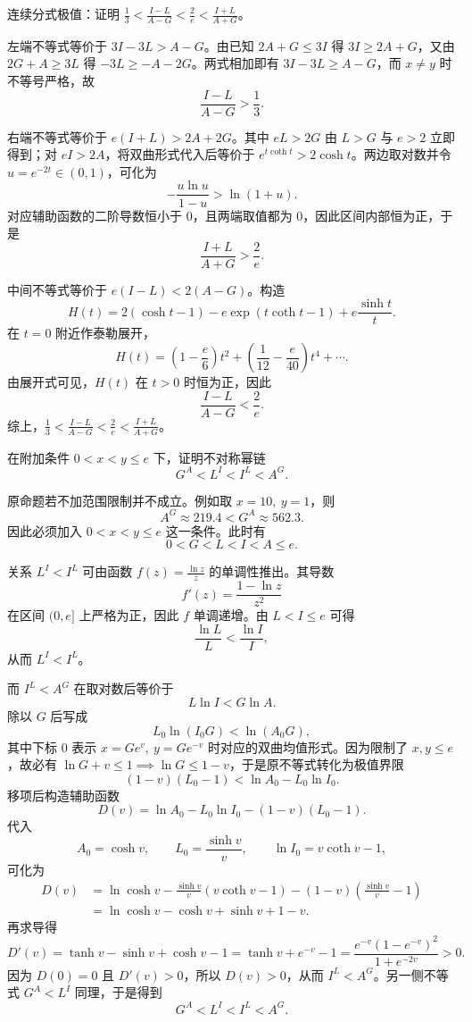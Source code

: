 \begin{example}
连续分式极值：证明 $\frac{1}{3} < \frac{I-L}{A-G} < \frac{2}{e} < \frac{I+L}{A+G}$。
\end{example}
\begin{solution}
左端不等式等价于 $3I - 3L > A-G$。由已知 $2A+G \le 3I$ 得 $3I \ge 2A+G$，又由 $2G+A \ge 3L$ 得 $-3L \ge -A-2G$。两式相加即有 $3I - 3L \ge A-G$，而 $x \neq y$ 时不等号严格，故
\[
\frac{I-L}{A-G} > \frac{1}{3}.
\]

右端不等式等价于 $e(I+L) > 2A+2G$。其中 $eL > 2G$ 由 $L>G$ 与 $e>2$ 立即得到；对 $eI > 2A$，将双曲形式代入后等价于 $e^{t\coth t} > 2\cosh t$。两边取对数并令 $u = e^{-2t} \in (0,1)$，可化为
\[
-\frac{u\ln u}{1-u} > \ln(1+u).
\]
对应辅助函数的二阶导数恒小于 $0$，且两端取值都为 $0$，因此区间内部恒为正，于是
\[
\frac{I+L}{A+G} > \frac{2}{e}.
\]

中间不等式等价于 $e(I-L) < 2(A-G)$。构造
\[
H(t) = 2(\cosh t - 1) - e\exp(t\coth t - 1) + e\frac{\sinh t}{t}.
\]
在 $t=0$ 附近作泰勒展开，
\[
H(t) = \left(1-\frac{e}{6}\right)t^2 + \left(\frac{1}{12}-\frac{e}{40}\right)t^4 + \cdots .
\]
由展开式可见，$H(t)$ 在 $t>0$ 时恒为正，因此
\[
\frac{I-L}{A-G} < \frac{2}{e}.
\]
综上，$\frac{1}{3} < \frac{I-L}{A-G} < \frac{2}{e} < \frac{I+L}{A+G}$。
\end{solution}

\begin{example}
在附加条件 $0 < x < y \le e$ 下，证明不对称幂链
\[
G^A < L^I < I^L < A^G.
\]
\end{example}
\begin{solution}
原命题若不加范围限制并不成立。例如取 $x=10,\ y=1$，则
\[
A^G \approx 219.4 < G^A \approx 562.3.
\]
因此必须加入 \(0<x<y\le e\) 这一条件。此时有
\[
0 < G < L < I < A \le e.
\]

关系 $L^I < I^L$ 可由函数 $f(z) = \frac{\ln z}{z}$ 的单调性推出。其导数
\[
f'(z) = \frac{1-\ln z}{z^2}
\]
在区间 \((0,e]\) 上严格为正，因此 \(f\) 单调递增。由 \(L<I\le e\) 可得
\[
\frac{\ln L}{L}<\frac{\ln I}{I},
\]
从而 \(L^I<I^L\)。

而 $I^L < A^G$ 在取对数后等价于
\[
L \ln I < G \ln A.
\]
除以 \(G\) 后写成
\[
L_0 \ln(I_0 G) < \ln(A_0 G),
\]
其中下标 \(0\) 表示 \(x=Ge^v,\ y=Ge^{-v}\) 时对应的双曲均值形式。因为限制了 $x,y \le e$，故必有 $\ln G + v \le 1 \implies \ln G \le 1-v$，于是原不等式转化为极值界限
\[
(1-v)(L_0 - 1) < \ln A_0 - L_0 \ln I_0.
\]
移项后构造辅助函数
\[
D(v) = \ln A_0 - L_0 \ln I_0 - (1-v)(L_0 - 1).
\]
代入
\[
A_0 = \cosh v,\qquad L_0 = \frac{\sinh v}{v},\qquad \ln I_0 = v\coth v - 1,
\]
可化为
\begin{align*}
D(v) &= \ln \cosh v - \frac{\sinh v}{v}(v\coth v - 1) - (1-v)\left(\frac{\sinh v}{v} - 1\right) \\
&= \ln \cosh v - \cosh v + \sinh v + 1 - v.
\end{align*}
再求导得
\[
D'(v) = \tanh v - \sinh v + \cosh v - 1
= \tanh v + e^{-v} - 1
= \frac{e^{-v}(1-e^{-v})^2}{1+e^{-2v}} > 0.
\]
因为 \(D(0)=0\) 且 \(D'(v)>0\)，所以 \(D(v)>0\)，从而 \(I^L<A^G\)。另一侧不等式 \(G^A<L^I\) 同理，于是得到
\[
G^A < L^I < I^L < A^G.
\]
\end{solution}

